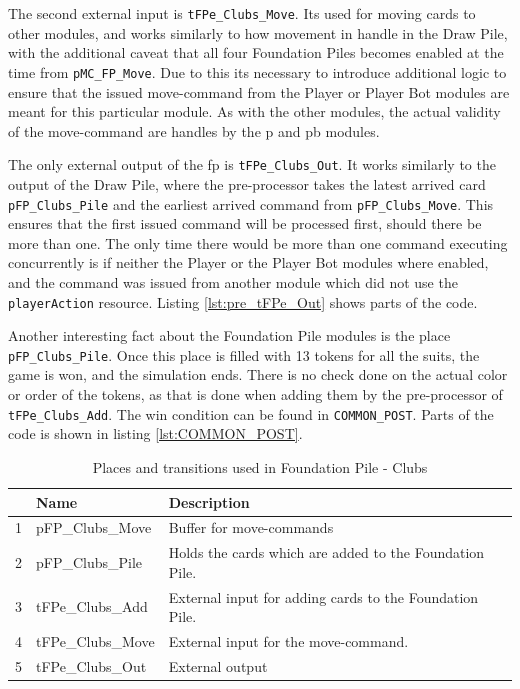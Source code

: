 \documentclass[runningheads,a4paper]{llncs}
\newcommand{\GPenSIM}{../GPenSIM}
\begin{document}
The second external input is \verb!tFPe_Clubs_Move!. Its used for moving cards to other modules, and works similarly to how movement in handle in the Draw Pile, with the additional caveat that all four Foundation Piles becomes enabled at the time from \verb!pMC_FP_Move!. Due to this its necessary to introduce additional logic to ensure that the issued move-command from the Player or Player Bot modules are meant for this particular module. As with the other modules, the actual validity of the move-command are handles by the \ac{p} and \ac{pb} modules.


The only external output of the {fp} is \verb!tFPe_Clubs_Out!. It works similarly to the output of the Draw Pile, where the pre-processor takes the latest arrived card \verb!pFP_Clubs_Pile! and the earliest arrived command from \verb!pFP_Clubs_Move!. This ensures that the first issued command will be processed first, should there be more than one. The only time there would be more than one command executing concurrently is if neither the Player or the Player Bot modules where enabled, and the command was issued from another module which did not use the \verb!playerAction! resource. Listing \ref{lst:pre_tFPe_Out} shows parts of the code.



Another interesting fact about the Foundation Pile modules is the place \verb!pFP_Clubs_Pile!. Once this place is filled with 13 tokens for all the suits, the game is won, and the simulation ends. There is no check done on the actual color or order of the tokens, as that is done when adding them by the pre-processor of \verb!tFPe_Clubs_Add!. The win condition can be found in \verb!COMMON_POST!. Parts of the code is shown in listing \ref{lst:COMMON_POST}.

\begin{table}
	\caption{Places and transitions used in Foundation Pile - Clubs}
	\begin{tabular}{|l|l|l|}
		\hline
		& Name & Description \\
		\hline
		1  & pFP\_Clubs\_Move        &  Buffer for move-\ac{command}s \\ \hline
		2  & pFP\_Clubs\_Pile        &  Holds the cards which are added to the Foundation Pile.\\ \hline
		3  & tFPe\_Clubs\_Add        &  External input for adding cards to the Foundation Pile.  \\ \hline
		4 & tFPe\_Clubs\_Move        &  External input for the move-command. \\ \hline
		5 & tFPe\_Clubs\_Out         &  External output  \\ \hline
	\end{tabular}
\end{table}
\clearpage
\end{document}
